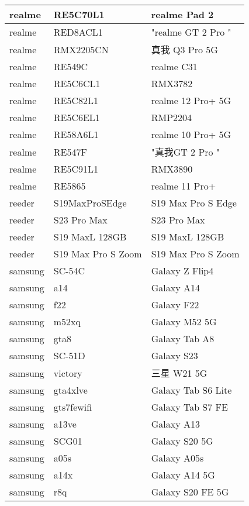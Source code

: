 \begin{tabularx}{\linewidth}{|l|X|X|}
        realme & RE5C70L1 & realme Pad 2 \\ \hline
        realme & RED8ACL1 & "realme GT 2 Pro	" \\ \hline
        realme & RMX2205CN & 真我 Q3 Pro 5G \\ \hline
        realme & RE549C & realme C31 \\ \hline
        realme & RE5C6CL1 & RMX3782 \\ \hline
        realme & RE5C82L1 & realme 12 Pro+ 5G \\ \hline
        realme & RE5C6EL1 & RMP2204 \\ \hline
        realme & RE58A6L1 & realme 10 Pro+ 5G \\ \hline
        realme & RE547F & "真我GT 2 Pro	" \\ \hline
        realme & RE5C91L1 & RMX3890 \\ \hline
        realme & RE5865 & realme 11 Pro+ \\ \hline
        reeder & S19MaxProSEdge & S19 Max Pro S Edge \\ \hline
        reeder & S23 Pro Max & S23 Pro Max \\ \hline
        reeder & S19 MaxL 128GB & S19 MaxL 128GB \\ \hline
        reeder & S19 Max Pro S Zoom & S19 Max Pro S Zoom \\ \hline
        samsung & SC-54C & Galaxy Z Flip4 \\ \hline
        samsung & a14 & Galaxy A14 \\ \hline
        samsung & f22 & Galaxy F22 \\ \hline
        samsung & m52xq & Galaxy M52 5G \\ \hline
        samsung & gta8 & Galaxy Tab A8 \\ \hline
        samsung & SC-51D & Galaxy S23 \\ \hline
        samsung & victory & 三星 W21 5G \\ \hline
        samsung & gta4xlve & Galaxy Tab S6 Lite \\ \hline
        samsung & gts7fewifi & Galaxy Tab S7 FE \\ \hline
        samsung & a13ve & Galaxy A13 \\ \hline
        samsung & SCG01 & Galaxy S20 5G \\ \hline
        samsung & a05s & Galaxy A05s \\ \hline
        samsung & a14x & Galaxy A14 5G \\ \hline
        samsung & r8q & Galaxy S20 FE 5G \\ \hline

\end{tabularx}
